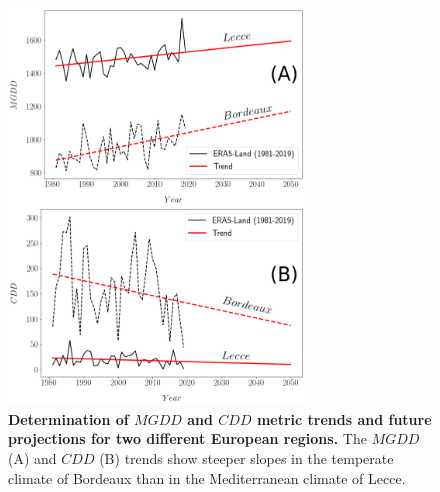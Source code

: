 \begin{figure}[H]
    \centering
    \includegraphics[width=0.7\textwidth]{Figures/MGDD_CDD_trends.png}
    \caption{\textbf{Determination of $MGDD$ and $CDD$ metric trends and
            future projections for two different European regions.} The $MGDD$
        (A) and
        $CDD$ (B) trends show steeper slopes in the temperate climate of
        Bordeaux than
        in the Mediterranean climate of Lecce.}
    \label{figS12} %
\end{figure}

